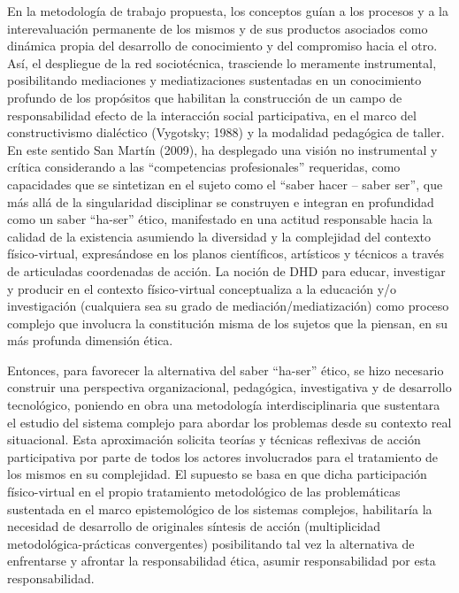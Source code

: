 En la metodología de trabajo propuesta, los conceptos guían a los procesos y a
la interevaluación permanente de los mismos y de sus productos asociados como
dinámica propia del desarrollo de conocimiento y del compromiso hacia el otro.
Así, el despliegue de la red sociotécnica, trasciende lo meramente 
instrumental, posibilitando mediaciones y mediatizaciones sustentadas en un
conocimiento profundo de los propósitos que habilitan la construcción de un
campo de responsabilidad efecto de la interacción social participativa, en el
marco del constructivismo dialéctico (Vygotsky; 1988) y la modalidad pedagógica
de taller. En este sentido San Martín (2009), ha desplegado una visión no
instrumental y crítica considerando a las   “competencias  profesionales”  
requeridas, como capacidades que se sintetizan en el sujeto como el “saber hacer
– saber ser”, que más allá de la singularidad disciplinar se construyen e
integran en profundidad como un saber “ha-ser” ético, manifestado en una actitud
responsable hacia la calidad de la existencia asumiendo la diversidad y la
complejidad del contexto físico-virtual, expresándose en los planos científicos,
artísticos y técnicos a través de articuladas coordenadas de acción. La noción
de DHD para educar, investigar y producir en el contexto físico-virtual
conceptualiza a la educación  y/o   investigación  (cualquiera   sea   su    
grado de mediación/mediatización) como proceso   complejo que  involucra   la
constitución misma de los sujetos que la piensan, en su más profunda dimensión
ética.

Entonces, para favorecer la alternativa del saber “ha-ser” ético, se hizo necesario
construir una perspectiva  organizacional, pedagógica, investigativa y de
desarrollo tecnológico, poniendo en obra una metodología interdisciplinaria que
sustentara el estudio del sistema complejo para abordar los problemas desde
su contexto real situacional. Esta aproximación solicita teorías y técnicas
reflexivas de acción participativa por parte de todos los actores
involucrados para el tratamiento de los mismos en su complejidad. El supuesto
se basa en que dicha participación físico-virtual en el propio tratamiento
metodológico de las problemáticas sustentada en el marco epistemológico de los
sistemas complejos, habilitaría la necesidad de desarrollo de originales
síntesis de acción (multiplicidad metodológica-prácticas
convergentes) posibilitando tal vez la alternativa de enfrentarse y afrontar la
responsabilidad ética, asumir responsabilidad por esta responsabilidad.

